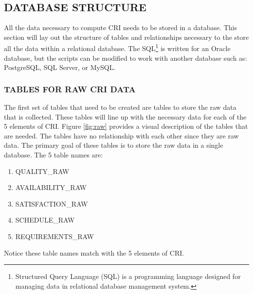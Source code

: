 \documentclass[SDSUThesis.tex]{subfiles}
\begin{document}
    \subsection{DATABASE STRUCTURE}
        All the data necessary to compute CRI needs to be stored in a database.  This section will 
        lay out the structure of tables and relationships necessary to the store all the data
        within a relational database.  The SQL\footnote{Structured Query Language (SQL) is 
        a programming language designed for managing data in relational database 
        management system.} 
        is written for an Oracle
        database, but the scripts can be modified to work with another database
        such as: PostgreSQL, SQL Server, or MySQL.  
        
        \subsubsection{TABLES FOR RAW CRI DATA}
        
            The first set of tables that need to be created are tables
            to store the raw data that is collected.  These tables
            will line up with the necessary data for each of the 5 elements
            of CRI.  Figure \ref{fig:raw} provides a visual description
            of the tables that are needed.  The tables have no relationship
            with each other since they are raw data.  The primary goal of
            these tables is to store the raw data in a single database. The
            5 table names are:
            \begin{enumerate}
                \item QUALITY\_RAW
                \item AVAILABILITY\_RAW
                \item SATISFACTION\_RAW
                \item SCHEDULE\_RAW
                \item REQUIREMENTS\_RAW
            \end{enumerate}
            Notice these table names match with the 5 elements of CRI.
        
\end{document}
